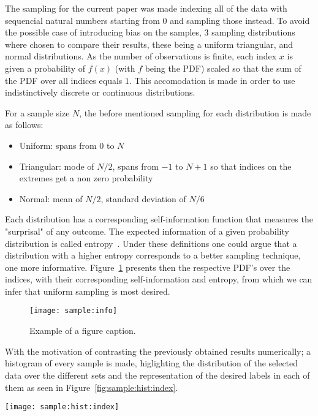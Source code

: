 \documentclass[journal]{IEEEtran}
\begin{document}
The sampling for the current paper was made indexing all of the data with
sequencial natural numbers starting from $0$ and sampling those instead. To
avoid the possible case of introducing bias on the samples, $3$ sampling
distributions where chosen to compare their results, these being a uniform
triangular, and normal distributions. As the number of observations is finite,
each index $x$ is given a probability of $f(x)$ (with $f$ being the PDF) scaled
so that the sum of the PDF over all indices equals $1$. This accomodation is
made in order to use indistinctively discrete or continuous distributions.

For a sample size $N$, the before mentioned sampling for each distribution is
made as follows:
\begin{itemize}
    \item Uniform: spans from $0$ to $N$
    \item Triangular: mode of $N/2$, spans from $-1$ to $N+1$ so that indices on
        the extremes get a non zero probability
    \item Normal: mean of $N/2$, standard deviation of $N/6$
\end{itemize}

Each distribution has a corresponding self-information function that measures
the "surprisal" of any outcome. The expected information of a given probability
distribution is called entropy~\cite{information:borda}. Under these definitions
one could argue that a distribution with a higher entropy corresponds to a
better sampling technique, one more informative. Figure~\ref{fig:sample:info}
presents then the respective PDF's over the indices, with their corresponding
self-information and entropy, from which we can infer that uniform sampling is
most desired.


\begin{figure}[ht]
    \texttt{[image: sample:info]}
    \caption{Example of a figure caption. \label{fig:sample:info}}
\end{figure}

With the motivation of contrasting the previously obtained results numerically;
a histogram of every sample is made, higlighting the distribution of the
selected data over the different sets and the representation of the desired
labels in each of them as seen in Figure~\ref{fig:sample:hist:index}.

\begin{figure*}[ht]
    \texttt{[image: sample:hist:index]}
    \caption{Example of a figure caption. \label{fig:sample:hist:index}}
\end{figure*}
\end{document}
